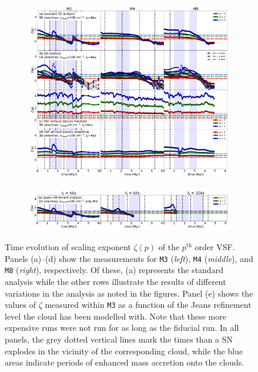 \begin{figure}[!htb]
	\centering  
  
  \begin{subfigure}[c]{\textwidth}
      \includegraphics[width=\textwidth]{zeta_all_nojeans.pdf}
      \label{pic:results:zeta_all_nojeans}
  \end{subfigure}
  \begin{subfigure}[c]{\textwidth}
      \addtocounter{subfigure}{4}
      \includegraphics[width=\textwidth]{zeta_jeans.pdf}
      \label{pic:results:zeta_all_jeans}
  \end{subfigure}
  
  \caption{Time evolution of scaling exponent $\zeta(p)$ of the $p^\mathrm{th}$ order VSF. Panels (a)--(d) show the measurements for \texttt{M3} (\textit{left}), \texttt{M4} (\textit{middle}), and \texttt{M8} (\textit{right}), respectively. Of these, (a) represents the standard analysis while the other rows illustrate the results of 
    different variations in the analysis as noted in the figures. 
Panel (e) shows the values of $\zeta$ measured within \texttt{M3} as a function of the Jeans refinement level the cloud has been modelled with. 
    Note that these more expensive runs were not run for as long as the fiducial run.  In all panels, the grey dotted vertical lines mark the times than a SN explodes in the vicinity of the corresponding cloud, while the blue areas indicate periods of enhanced mass accretion onto the clouds. }
	\label{pic:results:zeta_all}
\end{figure}

